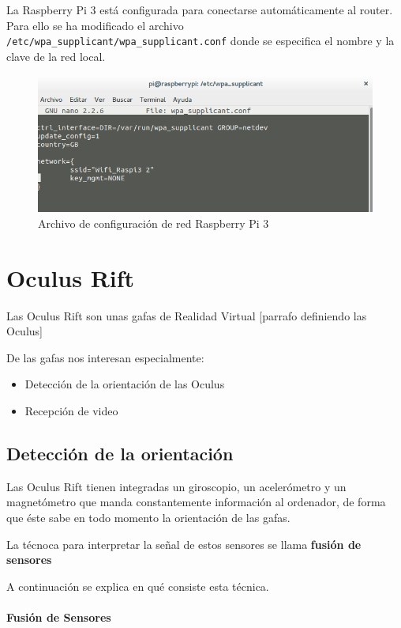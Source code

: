 \documentclass[twoside, 12pt]{epstfg}
\begin{document}
La Raspberry Pi 3 está configurada para conectarse automáticamente al router. Para ello se ha modificado el archivo \texttt{/etc/wpa\_supplicant/wpa\_supplicant.conf} donde se especifica el nombre y la clave de la red local.

\begin{figure}[h]
	\centerline{
		\mbox{\includegraphics[width=.95\textwidth]{images/confRaspiWifi.png}}
	}
	\caption{Archivo de configuración de red Raspberry Pi 3}
\end{figure}
 

\section{Oculus Rift}

Las Oculus Rift son unas gafas de Realidad Virtual [parrafo definiendo las Oculus]

De las gafas nos interesan especialmente:
\begin{itemize}
	\item Detección de la orientación de las Oculus
	\item Recepción de video
\end{itemize}

\subsection{Detección de la orientación}



Las Oculus Rift tienen integradas un giroscopio, un acelerómetro y un magnetómetro que manda constantemente información al ordenador, de forma que éste sabe en todo momento la orientación de las gafas.

La técnoca para interpretar la señal de estos sensores se llama \textbf{fusión de sensores}

A continuación se explica en qué consiste esta técnica.

\paragraph{Fusión de Sensores }
\end{document}
